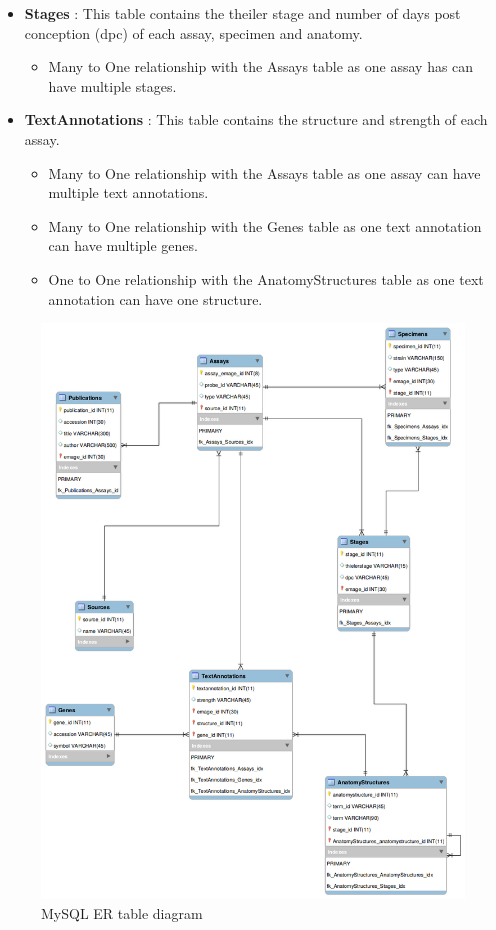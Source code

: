 \begin{itemize}
\item \textbf{Stages} : This table contains the theiler stage and number of days post conception (dpc) of each assay, specimen and anatomy.
\begin{itemize}
\item Many to One relationship with the Assays table as one assay has can have multiple stages.
\end{itemize} 

\item \textbf{TextAnnotations} : This table contains the structure and strength of each assay.
\begin{itemize}
\item Many to One relationship with the Assays table as one assay can have multiple text annotations.
\item Many to One relationship with the Genes table as one text annotation can have multiple genes.
\item One to One relationship with the AnatomyStructures table as one text annotation can have one structure.
\end{itemize} 

\end{itemize}

\newpage
\begin{figure}[H]\begin{center}\includegraphics[width=1\linewidth]{images/emage_erd}\caption{MySQL ER table diagram}\label{fig:mysql}\end{center}\end{figure}

